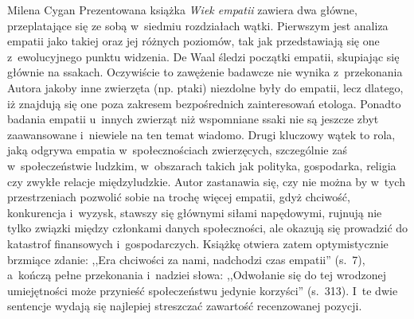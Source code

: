 \begin{recplenv}{Milena Cygan}
Prezentowana książka \textit{Wiek empatii} zawiera dwa główne, przeplatające się ze sobą w~siedmiu rozdziałach wątki.
Pierwszym jest analiza empatii jako takiej oraz jej różnych poziomów, tak jak przedstawiają się one z~ewolucyjnego
punktu widzenia. De Waal śledzi początki empatii, skupiając się głównie na ssakach. Oczywiście to zawężenie badawcze
nie wynika z~przekonania Autora jakoby inne zwierzęta (np. ptaki) niezdolne były do empatii, lecz dlatego, iż znajdują
się one poza zakresem bezpośrednich zainteresowań etologa. Ponadto badania empatii u~innych zwierząt niż wspomniane
ssaki nie są jeszcze zbyt zaawansowane i~niewiele na ten temat wiadomo. Drugi kluczowy wątek to rola, jaką odgrywa
empatia w~społecznościach zwierzęcych, szczególnie zaś w~społeczeństwie ludzkim, w~obszarach takich jak polityka,
gospodarka, religia czy zwykłe relacje międzyludzkie. Autor zastanawia się, czy nie można by w~tych przestrzeniach
pozwolić sobie na trochę więcej empatii, gdyż chciwość, konkurencja i~wyzysk, stawszy się głównymi siłami napędowymi,
rujnują nie tylko związki między członkami danych społeczności, ale okazują się prowadzić do katastrof
finansowych i~gospodarczych. Książkę otwiera zatem optymistycznie brzmiące zdanie: ,,Era chciwości za nami,
nadchodzi czas empatii''
(s.~7), a~kończą pełne przekonania i~nadziei słowa: ,,Odwołanie się do tej wrodzonej umiejętności może przynieść
społeczeństwu jedynie korzyści'' (s.~313). I~te dwie sentencje wydają się najlepiej streszczać zawartość recenzowanej
pozycji.


\end{recplenv}
